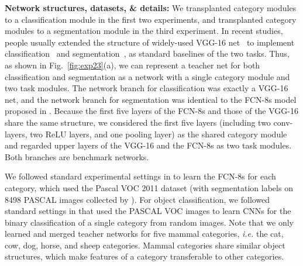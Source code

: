 \documentclass[10pt,twocolumn,letterpaper]{article}
\begin{document}
\textbf{Network structures, datasets, \& details:} We transplanted category modules to a classification module in the first two experiments, and transplanted category modules to a segmentation module in the third experiment. In recent studies, people usually extended the structure of widely-used VGG-16 net~\cite{VGG} to implement classification~\cite{VGG,interpretableCNN} and segmentation~\cite{VGGSeg}, as standard baselines of the two tasks. Thus, as shown in Fig.~\ref{fig:exp23}(a), we can represent a teacher net for both classification and segmentation as a network with a single category module and two task modules. The network branch for classification was exactly a VGG-16 net, and the network branch for segmentation was identical to the FCN-8s model proposed in \cite{VGGSeg}. Because the first five layers of the FCN-8s and those of the VGG-16 share the same structure, we considered the first five layers (including two conv-layers, two ReLU layers, and one pooling layer) as the shared category module and regarded upper layers of the VGG-16 and the FCN-8s as two task modules. Both branches are benchmark networks.

We followed standard experimental settings in \cite{VGGSeg} to learn the FCN-8s for each category, which used the Pascal VOC 2011 dataset (with segmentation labels on 8498 PASCAL images collected by \cite{VOCSeg}). For object classification, we followed standard settings in \cite{interpretableCNN} that used the PASCAL VOC images to learn CNNs for the binary classification of a single category from random images. Note that we only learned and merged teacher networks for five mammal categories, \emph{i.e.} the cat, cow, dog, horse, and sheep categories. Mammal categories share similar object structures, which make features of a category transferable to other categories.
\end{document}
